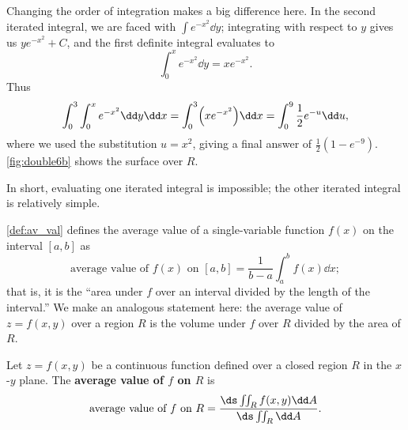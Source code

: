 \begin{example}
Changing the order of integration makes a big difference here. In the second iterated integral, we are faced with $\int e^{-x^2}\dd y$; integrating with respect to $y$ gives us $ye^{-x^2}+C$, and the first definite integral evaluates to 
\[\int_0^x e^{-x^2}\dd y = xe^{-x^2}.\]
%
%
%
Thus 
\[
 \int_0^3\int_0^x e^{-x^2}\dd y\dd x
 = \int_0^3\Bigl(xe^{-x^2}\Bigr)\dd x
 = \int_0^9\frac12 e^{-u}\dd u,
\]
where we used the substitution $u=x^2$, giving a final answer of $\frac12(1-e^{-9})%
$. \autoref{fig:double6b} shows the surface over $R$.

In short, evaluating one iterated integral is impossible; the other iterated integral is relatively simple.
\end{example}

\autoref{def:av_val} defines the average value of a single-variable function $f(x)$ on the interval $[a,b]$ as
\[\text{average value of $f(x)$ on $[a,b]$} = \frac1{b-a}\int_a^b f(x)\dd x;\]
that is, it is the ``area under $f$ over an interval divided by the length of the interval.'' We make an analogous statement here: the average value of $z=f(x,y)$ over a region $R$ is the volume under $f$ over $R$ divided by the area of $R$.

\begin{definition}\label{def:av_val2}
Let $z=f(x,y)$ be a continuous function defined over a closed region $R$ in the $x$-$y$ plane. The \textbf{average value of $f$ on $R$} is 
\[\text{average value of $f$ on $R$} = \frac{\ds \iint_R f(x,y)\dd A}{\ds\iint_R \dd A}.\]
\end{definition}

